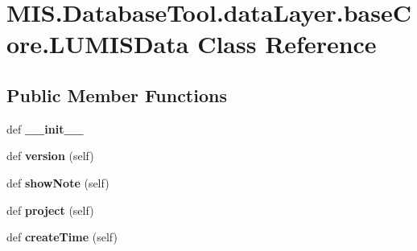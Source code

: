 \hypertarget{classMIS_1_1DatabaseTool_1_1dataLayer_1_1baseCore_1_1LUMISData}{}\section{M\+I\+S.\+Database\+Tool.\+data\+Layer.\+base\+Core.\+L\+U\+M\+I\+S\+Data Class Reference}
\label{classMIS_1_1DatabaseTool_1_1dataLayer_1_1baseCore_1_1LUMISData}
\subsection*{Public Member Functions}
\begin{DoxyCompactItemize}
\item 
\mbox{\label{classMIS_1_1DatabaseTool_1_1dataLayer_1_1baseCore_1_1LUMISData_a2e2e14e4a5fd41a7b2c305e317d730ef}} 
def {\bfseries \+\_\+\+\_\+init\+\_\+\+\_\+}
\item 
\mbox{\label{classMIS_1_1DatabaseTool_1_1dataLayer_1_1baseCore_1_1LUMISData_acebb04038810b05660bda5d8385f04e4}} 
def {\bfseries version} (self)
\item 
\mbox{\label{classMIS_1_1DatabaseTool_1_1dataLayer_1_1baseCore_1_1LUMISData_a4db78afc058c59014d2bebb03632210d}} 
def {\bfseries show\+Note} (self)
\item 
\mbox{\label{classMIS_1_1DatabaseTool_1_1dataLayer_1_1baseCore_1_1LUMISData_ae151947f17020ca240763f8a99d4949c}} 
def {\bfseries project} (self)
\item 
\mbox{\label{classMIS_1_1DatabaseTool_1_1dataLayer_1_1baseCore_1_1LUMISData_a0a863fbdb5a7c04704a1a0660b53294d}} 
def {\bfseries create\+Time} (self)
\item 
\mbox{\label{classMIS_1_1DatabaseTool_1_1dataLayer_1_1baseCore_1_1LUMISData_a269c9574d2fb180d617736ffc82cc077}} 

\end{DoxyCompactItemize}
